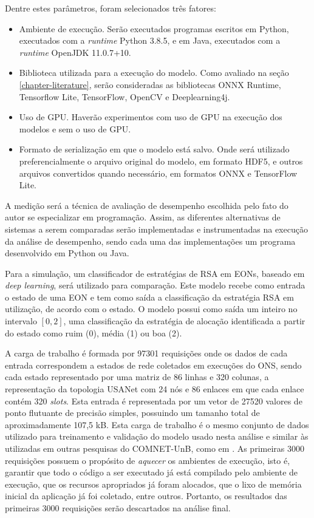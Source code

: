 Dentre estes parâmetros, foram selecionados três fatores:

\begin{itemize}
  \item Ambiente de execução. Serão executados programas escritos em Python, executados com a \textit{runtime} Python 3.8.5, e em Java, executados com a \textit{runtime} OpenJDK 11.0.7+10.
  \item Biblioteca utilizada para a execução do modelo. Como avaliado na seção \ref{chapter-literature}, serão consideradas as bibliotecas ONNX Runtime, Tensorflow Lite, TensorFlow, OpenCV e Deeplearning4j.
  \item Uso de GPU. Haverão experimentos com uso de GPU na execução dos modelos e sem o uso de GPU.
  \item Formato de serialização em que o modelo está salvo. Onde será utilizado preferencialmente o arquivo original do modelo, em formato HDF5, e outros arquivos convertidos quando necessário, em formatos ONNX e TensorFlow Lite.
\end{itemize}

A medição será a técnica de avaliação de desempenho escolhida pelo fato do autor se especializar em programação. Assim, as diferentes alternativas de sistemas a serem comparadas serão implementadas e instrumentadas na execução da análise de desempenho, sendo cada uma das implementações um programa desenvolvido em Python ou Java.

Para a simulação, um classificador de estratégias de RSA em EONs, baseado em \textit{deep learning}, será utilizado para comparação. Este modelo recebe como entrada o estado de uma EON e tem como saída a classificação da estratégia RSA em utilização, de acordo com o estado. O modelo possui como saída um inteiro no intervalo $[0, 2]$, uma classificação da estratégia de alocação identificada a partir do estado como ruim (0), média (1) ou boa (2).

A carga de trabalho é formada por 97301 requisições onde os dados de cada entrada correspondem a estados de rede coletados em execuções do ONS, sendo cada estado representado por uma matriz de 86 linhas e 320 colunas, a representação da topologia USANet com 24 nós e 86 enlaces em que cada enlace contém 320 \textit{slots}. Esta entrada é representada por um vetor de 27520 valores de ponto flutuante de precisão simples, possuindo um tamanho total de aproximadamente 107,5 kB. Esta carga de trabalho é o mesmo conjunto de dados utilizado para treinamento e validação do modelo usado nesta análise e similar às utilizadas em outras pesquisas do \acrfull{COMNET-UnB}, como em \cite{eon_ml_classifier_2020}. As primeiras 3000 requisições possuem o propósito de \textit{aquecer} os ambientes de execução, isto é, garantir que todo o código a ser executado já está compilado pelo ambiente de execução, que os recursos apropriados já foram alocados, que o lixo de memória inicial da aplicação já foi coletado, entre outros. Portanto, os resultados das primeiras 3000 requisições serão descartados na análise final.

